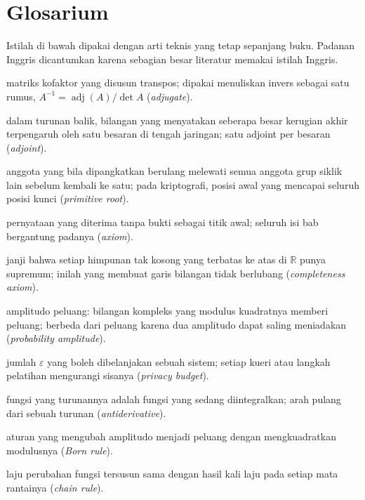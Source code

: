 \documentclass[11pt,a4paper,oneside]{book}
\theoremstyle{definition}
\theoremstyle{plain}
\theoremstyle{remark}
\begin{document}
\chapter{Glosarium}
\label{app:glosarium}

Istilah di bawah dipakai dengan arti teknis yang tetap sepanjang buku. Padanan
Inggris dicantumkan karena sebagian besar literatur memakai istilah Inggris.

\begin{description}[style=nextline,itemsep=0.35em]
  \item[Adjoin] matriks kofaktor yang disusun transpos; dipakai menuliskan invers sebagai satu rumus, $A^{-1}=\operatorname{adj}(A)/\det A$ (\emph{adjugate}).
  \item[Adjoint] dalam turunan balik, bilangan yang menyatakan seberapa besar kerugian akhir terpengaruh oleh satu besaran di tengah jaringan; satu adjoint per besaran (\emph{adjoint}).
  \item[Akar primitif] anggota yang bila dipangkatkan berulang melewati semua anggota grup siklik lain sebelum kembali ke satu; pada kriptografi, posisi awal yang mencapai seluruh posisi kunci (\emph{primitive root}).
  \item[Aksioma] pernyataan yang diterima tanpa bukti sebagai titik awal; seluruh isi bab bergantung padanya (\emph{axiom}).
  \item[Aksioma kelengkapan] janji bahwa setiap himpunan tak kosong yang terbatas ke atas di $\mathbb{R}$ punya supremum; inilah yang membuat garis bilangan tidak berlubang (\emph{completeness axiom}).
  \item[Amplitudo] amplitudo peluang: bilangan kompleks yang modulus kuadratnya memberi peluang; berbeda dari peluang karena dua amplitudo dapat saling meniadakan (\emph{probability amplitude}).
  \item[Anggaran privasi] jumlah $\varepsilon$ yang boleh dibelanjakan sebuah sistem; setiap kueri atau langkah pelatihan mengurangi sisanya (\emph{privacy budget}).
  \item[Antiturunan] fungsi yang turunannya adalah fungsi yang sedang diintegralkan; arah pulang dari sebuah turunan (\emph{antiderivative}).
  \item[Aturan Born] aturan yang mengubah amplitudo menjadi peluang dengan mengkuadratkan modulusnya (\emph{Born rule}).
  \item[Aturan rantai] laju perubahan fungsi tersusun sama dengan hasil kali laju pada setiap mata rantainya (\emph{chain rule}).

\end{description}
\end{document}
